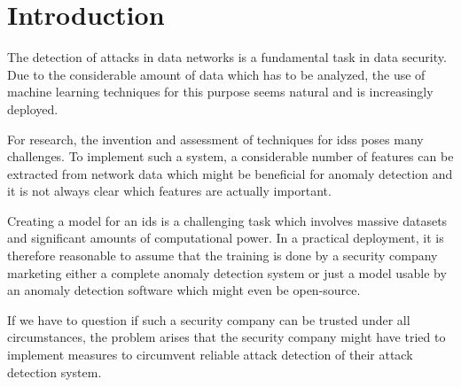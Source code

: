\documentclass[10pt,sigconf,letterpaper,dvipsnames]{acmart}
\begin{document}


\maketitle

\section{Introduction}
The detection of attacks in data networks is a fundamental task in data security. Due to the considerable amount of data which has to be analyzed, the use of machine learning techniques for this purpose seems natural and is increasingly deployed.

For research, the invention and assessment of techniques for \glspl{ids} poses many challenges. To implement such a system, a considerable number of features can be extracted from network data which might be beneficial for anomaly detection and it is not always clear which features are actually important.

Creating a model for an \gls{ids} is a challenging task which involves massive datasets and significant amounts of computational power. In a practical deployment, it is therefore reasonable to assume that the training is done by a security company marketing either a complete anomaly detection system or just a model usable by an anomaly detection software which might even be open-source.

If we have to question if such a security company can be trusted under all circumstances, the problem arises that the security company might have tried to implement measures to circumvent reliable attack detection of their attack detection system.
\end{document}
